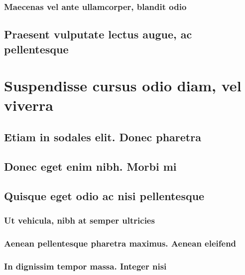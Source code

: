 \documentclass[bachelor, english, debug]{student}
\begin{document}
\lipsum[1-8]

\subsubsection{Maecenas vel ante ullamcorper, blandit odio}

\lipsum[1-8]

\subsection{Praesent vulputate lectus augue, ac pellentesque}

\lipsum[1-8]

\section{Suspendisse cursus odio diam, vel viverra}

\lipsum[1-8]

\subsection{Etiam in sodales elit. Donec pharetra}

\lipsum[1-8]

\subsection{Donec eget enim nibh. Morbi mi}

\lipsum[1-8]

\subsection{Quisque eget odio ac nisi pellentesque}

\lipsum[1-8]

\subsubsection{Ut vehicula, nibh at semper ultricies}

\lipsum[1-8]

\subsubsection{Aenean pellentesque pharetra maximus. Aenean eleifend}

\lipsum[1-8]

\subsubsection{In dignissim tempor massa. Integer nisi}
\end{document}
